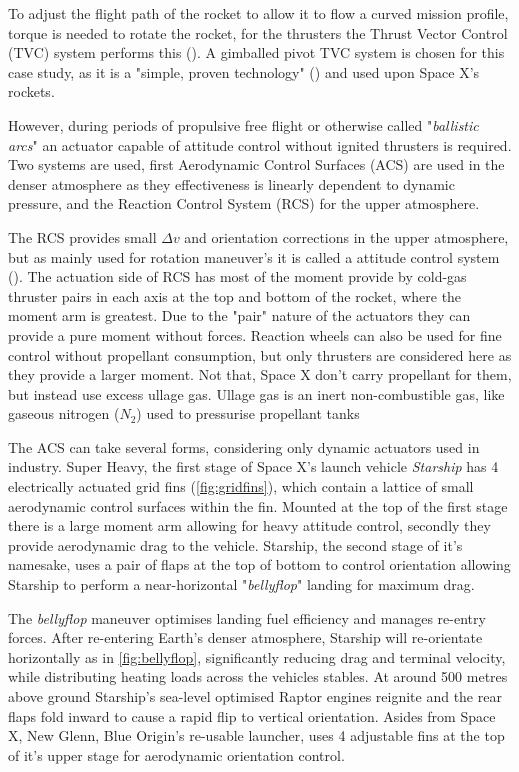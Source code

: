 To adjust the flight path of the rocket to allow it to flow a curved mission profile, torque is needed to rotate the rocket, for the thrusters the Thrust Vector Control (TVC) system performs this (\cite{sutton_rocket_2016}). A gimballed pivot TVC system is chosen for this case study, as it is a "simple, proven technology" (\cite{sutton_rocket_2016}) and used upon Space X's rockets.

However, during periods of propulsive free flight or otherwise called "\textit{ballistic arcs}" an actuator capable of attitude control without ignited thrusters is required. Two systems are used, first Aerodynamic Control Surfaces (ACS) are used in the denser atmosphere as they effectiveness is linearly dependent to dynamic pressure, and the Reaction Control System (RCS) for the upper atmosphere.

The RCS provides small $\Delta v$ and orientation corrections in the upper atmosphere, but as mainly used for rotation maneuver's it is called a attitude control system (\cite{sutton_rocket_2016}). The actuation side of RCS has most of the moment provide by cold-gas thruster pairs in each axis at the top and bottom of the rocket, where the moment arm is greatest. Due to the "pair" nature of the actuators they can provide a pure moment without forces. Reaction wheels can also be used for fine control without propellant consumption, but only thrusters are considered here as they provide a larger moment. Not that, Space X don't carry propellant for them, but instead use excess ullage gas. Ullage gas is an inert non-combustible gas, like gaseous nitrogen ($N_2$) used to pressurise propellant tanks

The ACS can take several forms, considering only dynamic actuators used in industry. Super Heavy, the first stage of Space X's launch vehicle \textit{Starship} has 4 electrically actuated grid fins (\autoref{fig:gridfins}), which contain a lattice of small aerodynamic control surfaces within the fin. Mounted at the top of the first stage there is a large moment arm allowing for heavy attitude control, secondly they provide aerodynamic drag to the vehicle. Starship, the second stage of it's namesake, uses a pair of flaps at the top of bottom to control orientation allowing Starship to perform a near-horizontal "\textit{bellyflop}" landing for maximum drag.

The \textit{bellyflop} maneuver optimises landing fuel efficiency and manages re-entry forces. After re-entering Earth's denser atmosphere, Starship will re-orientate horizontally as in \autoref{fig:bellyflop}, significantly reducing drag and terminal velocity, while distributing heating loads across the vehicles stables. At around 500 metres above ground Starship's sea-level optimised Raptor engines reignite and the rear flaps fold inward to cause a rapid flip to vertical orientation. Asides from Space X, New Glenn, Blue Origin's re-usable launcher, uses 4 adjustable fins at the top of it's upper stage for aerodynamic orientation control.

